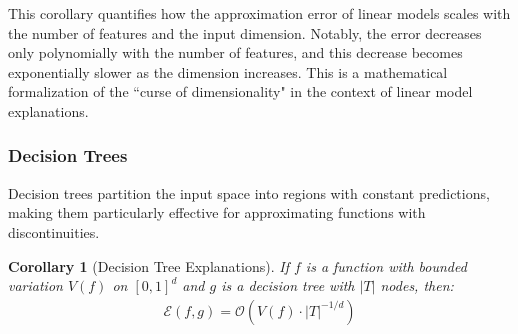 \documentclass[11pt,letter,leqno]{article}
\newtheorem{corollary}[theorem]{Corollary}
\begin{document}
This corollary quantifies how the approximation error of linear models scales with the number of features and the input dimension.  Notably, the error decreases only polynomially with the number of features, and this decrease becomes exponentially slower as the dimension increases.  This is a mathematical formalization of the ``curse of dimensionality" in the context of linear model explanations.

\subsubsection{Decision Trees}
\label{subsubsec:decision-trees}

Decision trees partition the input space into regions with constant predictions, making them particularly effective for approximating functions with discontinuities.

\begin{corollary}[Decision Tree Explanations]
\label{cor:decision-tree}
If $f$ is a function with bounded variation $V(f)$ on $[0, 1]^d$ and $g$ is a decision tree with $|T|$ nodes, then:
\begin{align}
\mathcal{E}(f, g) = \mathcal{O}\left(V(f) \cdot |T|^{-1/d}\right)
\end{align}
\end{corollary}
\end{document}
